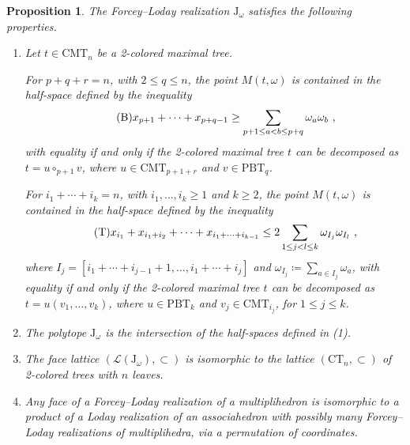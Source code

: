 \documentclass[twoside, 12pt]{amsart}
\newtheorem{proposition}[definition]{Proposition}
\theoremstyle{remark}
\newcommand{\J}{\mathrm{J}}
\newcommand{\La}{\mathcal{L}}
\newcommand{\Tam}[1]{\mathrm{PBT}_{#1}}
\newcommand{\CT}[1]{\mathrm{CT}_{#1}}
\newcommand{\CMT}[1]{\mathrm{CMT}_{#1}}
\newcommand{\B}{\mathrm{B}}
\newcommand{\T}{\mathrm{T}}
\begin{document}
\begin{proposition}\label{prop:PropertiesKLoday}
The Forcey--Loday realization $\J_\omega$  satisfies the following properties. 
\begin{enumerate}
\item Let $t\in \CMT{n}$ be a 2-colored maximal tree. 

\noindent For $p+q+r=n$, with $2\leq q\leq n$, the point $M(t, \omega)$ is contained in the half-space defined by the inequality
\begin{equation}\label{Eq:B}\tag{$\B$}
x_{p+1}+\cdots+x_{p+q-1}\geq \sum_{p+1\leq a<b\leq p+q} \omega_a \omega_b\ , 
\end{equation}
with equality if and only if the 2-colored maximal tree $t$ can be decomposed as $t=u\circ_{p+1} v$, where $u\in\CMT{p+1+r}$ and $v\in \Tam{q}$. 

\noindent For $i_1+\cdots+i_k=n$, with $i_1, \ldots,i_k\geq 1$ and $k\geq 2$, the point $M(t, \omega)$ is contained in the half-space defined by the inequality
\begin{equation}\label{Eq:T}\tag{$\T$}
x_{i_1}+x_{i_1+i_2}+\cdots+x_{i_1+\cdots+i_{k-1}}\leq 
2\sum_{1\leq j<l\leq k} \omega_{I_j} \omega_{I_l}\ , 
\end{equation}
where $I_j=[i_1+\cdots +i_{j-1}+1, \ldots, i_1+\cdots +i_j]$ and $\omega_{I_j}\coloneq\sum_{a\in I_j} \omega_a$, with equality if and only if the 2-colored maximal tree $t$ can be decomposed as $t=u(v_1, \ldots, v_k)$, where $u\in\Tam{k}$ and $v_j\in \CMT{i_j}$, for $1\leq j\leq k$. 


\item The polytope $\J_\omega$ is the intersection of the half-spaces defined in  \emph{(1)}. 

\item The face lattice $(\La(\J_\omega), \subset)$ is isomorphic to the lattice $(\CT{n}, \subset)$ of 2-colored trees with $n$ leaves.

\item Any face of a Forcey--Loday realization of a multiplihedron is isomorphic to a product of a Loday realization of an associahedron with possibly many Forcey--Loday realizations of multiplihedra, via a permutation of coordinates. 
\end{enumerate}
\end{proposition}
\end{document}
